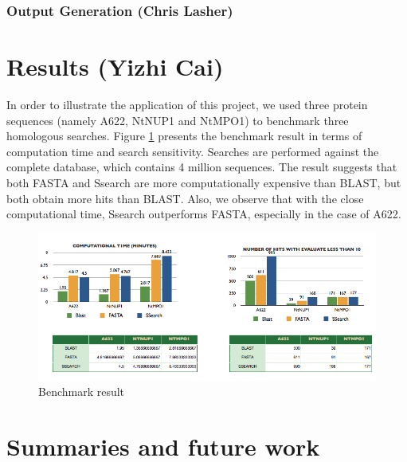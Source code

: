 \documentclass[11pt,letterpaper,twoside,english]{article}
\begin{document}
\subsubsection{\label{sub:Output-Generation}Output Generation (Chris Lasher)}


\section{Results (Yizhi Cai)}

In order to illustrate the application of this project, we used three
protein sequences (namely A622, NtNUP1 and NtMPO1) to benchmark three
homologous searches. Figure \ref{fig:Benchmark-result} presents the
benchmark result in terms of computation time and search sensitivity.
Searches are performed against the complete database, which contains
4 million sequences. The result suggests that both FASTA and Ssearch
are more computationally expensive than BLAST, but both obtain more
hits than BLAST. Also, we observe that with the close computational
time, Ssearch outperforms FASTA, especially in the case of A622.

%
\begin{figure}[H]
\begin{centering}
\includegraphics[width=0.8\linewidth]{figures/Bench_mark_result}
\par\end{centering}

\caption{\label{fig:Benchmark-result}Benchmark result}

\end{figure}



\section{Summaries and future work}
\end{document}
